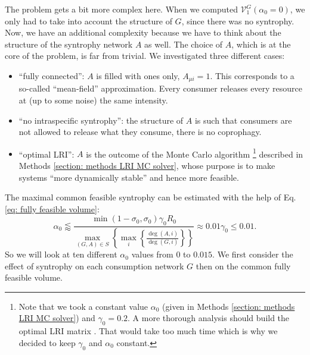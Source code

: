 \documentclass[12pt, titlepage]{report}
\begin{document}
The problem gets a bit more complex here. When we computed $\mathcal{V}^G_1(\alpha_0=0)$, we only had to take into account the structure of $G$, since there was no syntrophy. Now, we have an additional complexity because we have to think about the structure of the syntrophy network $A$ as well. The choice of $A$, which is at the core of the problem, is far from trivial. We investigated three different cases:
\begin{itemize}
  \item ``fully connected'': $A$ is filled with ones only, $A_{\mu i}=1$. This corresponds to a so-called ``mean-field'' approximation. Every consumer releases every resource at (up to some noise) the same intensity.
  \item ``no intraspecific syntrophy'': the structure of $A$ is such that consumers are not allowed to release what they consume, \ie there is no coprophagy.
  \item ``optimal LRI'': $A$ is the outcome of the Monte Carlo algorithm \footnote{Note that we took a constant value $\alpha_0$ (given in Methods \ref{section: methods LRI MC solver}) and $\gamma_0=0.2$. A more thorough analysis should build the optimal LRI matrix . That would take too much time which is why we decided to keep $\gamma_0$ and $\alpha_0$ constant.}
 described in Methods \ref{section: methods LRI MC solver}, whose purpose is to make systems ``more dynamically stable'' and hence more feasible.
  \end{itemize}
  The maximal common feasible syntrophy can be estimated with the help of Eq.\eqref{eq: fully feasible volume}:
  \begin{equation}
  \alpha_0 \lessapprox \frac{\min(1-\sigma_0, \sigma_0)\gamma_0 R_0}{\max_{(G,A)\in S}\left\{\max_i\left\{\frac{\deg(A,i)}{\deg(G,i)}\right\}\right\}} \approx 0.01 \gamma_0 \leq 0.01.
  \end{equation}
  So we will look at ten different $\alpha_0$ values from $0$ to $0.015$. We first consider the effect of syntrophy on each consumption network $G$ then on the common fully feasible volume.
  \FloatBarrier
\end{document}
